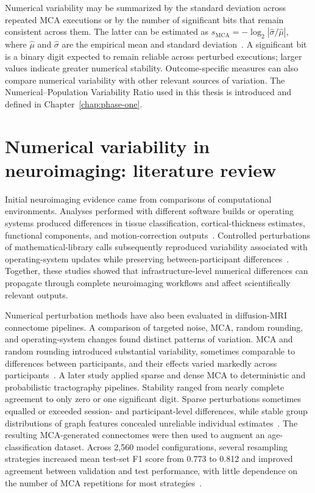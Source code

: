 Numerical variability may be summarized by the standard deviation across repeated MCA executions or by the number of significant bits that remain consistent across them. The latter can be estimated as $s_{\mathrm{MCA}}=-\log_2|\hat{\sigma}/\hat{\mu}|$, where $\hat{\mu}$ and $\hat{\sigma}$ are the empirical mean and standard deviation~\cite{Sohier2021Confidence}. A significant bit is a binary digit expected to remain reliable across perturbed executions; larger values indicate greater numerical stability. Outcome-specific measures can also compare numerical variability with other relevant sources of variation. The Numerical--Population Variability Ratio used in this thesis is introduced and defined in Chapter~\ref{chap:phase-one}.

\section{Numerical variability in neuroimaging: literature review}

Initial neuroimaging evidence came from comparisons of computational environments. Analyses performed with different software builds or operating systems produced differences in tissue classification, cortical-thickness estimates, functional components, and motion-correction outputs~\cite{Glatard2015}. Controlled perturbations of mathematical-library calls subsequently reproduced variability associated with operating-system updates while preserving between-participant differences~\cite{Salari2021}. Together, these studies showed that infrastructure-level numerical differences can propagate through complete neuroimaging workflows and affect scientifically relevant outputs.

Numerical perturbation methods have also been evaluated in diffusion-MRI connectome pipelines. A comparison of targeted noise, MCA, random rounding, and operating-system changes found distinct patterns of variation. MCA and random rounding introduced substantial variability, sometimes comparable to differences between participants, and their effects varied markedly across participants~\cite{Kiar2020}. A later study applied sparse and dense MCA to deterministic and probabilistic tractography pipelines. Stability ranged from nearly
complete agreement to only zero or one significant digit. Sparse perturbations sometimes equalled or exceeded session- and participant-level differences, while stable group distributions of graph features concealed unreliable individual estimates~\cite{Kiar2021}. The resulting MCA-generated connectomes were then used to augment an age-classification dataset. Across 2,560 model configurations, several resampling strategies increased mean test-set F1 score from 0.773 to 0.812 and improved agreement between validation and test performance, with little dependence on the number of MCA repetitions for most strategies~\cite{Kiar2021Augmentation}.

